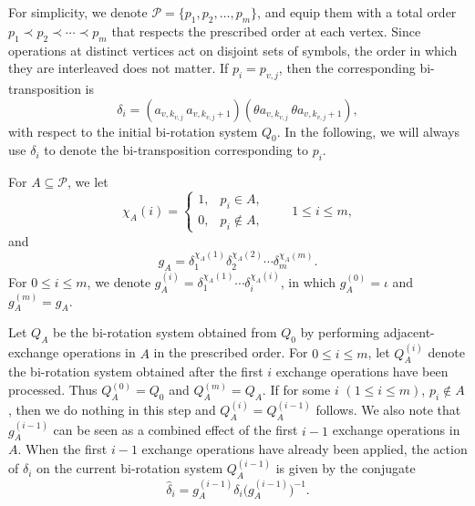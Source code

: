 \documentclass[12pt]{article}
\theoremstyle{definition}
\begin{document}
For simplicity, we denote
$\mathcal P=\{p_1,p_2,\ldots,p_m\}$, and equip them with a total order $p_1\prec p_2\prec\cdots\prec p_m$
that respects the prescribed order at each vertex.
Since operations at distinct vertices act on disjoint sets of symbols, the order in which they are interleaved does not matter. If $p_i=p_{v,j}$, then the corresponding  bi-transposition is
$$
\delta_i=
(a_{v,k_{v,j}}\,a_{v,k_{v,j}+1})
(\theta a_{v,k_{v,j}}\,\theta a_{v,k_{v,j}+1}),
$$
with respect to the initial bi-rotation system $Q_0$. In the following, we will always use $\delta_i$ to denote the bi-transposition corresponding to $p_i$.

For $A\subseteq\mathcal P$, we let
$$\chi_A(i)= \begin{cases} 1, & p_i\in A,\\ 0, & p_i\notin A, \end{cases} \qquad 1\le i\le m,$$  and
$$g_A=
\delta_1^{\chi_A(1)}
\delta_2^{\chi_A(2)}
\cdots
\delta_m^{\chi_A(m)}.$$
For $0\leq i\leq m$,  we denote
$g_A^{(i)}=\delta_1^{\chi_A(1)}\cdots
\delta_i^{\chi_A(i)}$, in which $g_A^{(0)}=\iota$ and
$g_A^{(m)}=g_A$.

Let $Q_A$ be the bi-rotation system obtained from $Q_0$ by performing adjacent-exchange operations in $A$ in the prescribed order. For
$0\leq i\leq m$, let $Q_A^{(i)}$ denote the bi-rotation system obtained
after the first $i$ exchange operations have been processed. Thus
$Q_A^{(0)}=Q_0$ and $Q_A^{(m)}=Q_A$. If for some $i$ $(1\leq i \leq m)$, $p_i\notin A$, then we do nothing in this step and $Q_A^{(i)}=Q_A^{(i-1)}$ follows. We also note that $g_A^{(i-1)}$
can be seen as a combined effect of the first $i-1$ exchange operations in $A$.  When the first $i-1$ exchange operations have already been applied, the action of $\delta_i$ on the current bi-rotation system $Q_{A}^{(i-1)}$
is given by the conjugate
\[
\widehat{\delta}_i
=
g_A^{(i-1)}\delta_i
\bigl(g_A^{(i-1)}\bigr)^{-1}.
\]
\end{document}

